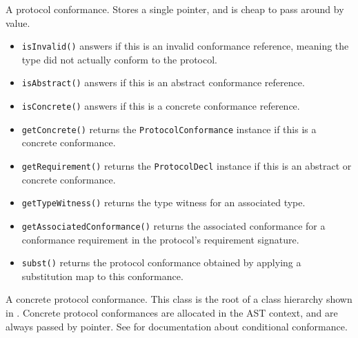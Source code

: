 \documentclass[../generics]{subfiles}
\begin{document}
A protocol conformance. Stores a single pointer, and is cheap to pass around by value.
\begin{itemize}
\item \texttt{isInvalid()} answers if this is an invalid conformance reference, meaning the type did not actually conform to the protocol.
\item \texttt{isAbstract()} answers if this is an abstract conformance reference.
\item \texttt{isConcrete()} answers if this is a concrete conformance reference.
\item \texttt{getConcrete()} returns the \texttt{ProtocolConformance} instance if this is a concrete conformance.
\item \texttt{getRequirement()} returns the \texttt{ProtocolDecl} instance if this is an abstract or concrete conformance.
\item \texttt{getTypeWitness()} returns the type witness for an associated type.
\item \texttt{getAssociatedConformance()} returns the associated conformance for a conformance requirement in the protocol's requirement signature.
\item \texttt{subst()} returns the protocol conformance obtained by applying a substitution map to this conformance.
\end{itemize}

A concrete protocol conformance. This class is the root of a class hierarchy shown in . Concrete protocol conformances are allocated in the AST context, and are always passed by pointer. See  for documentation about conditional conformance.

\begin{figure}\label{conformancehierarchy}
\begin{center}
\end{center}
\end{figure}
\end{document}
